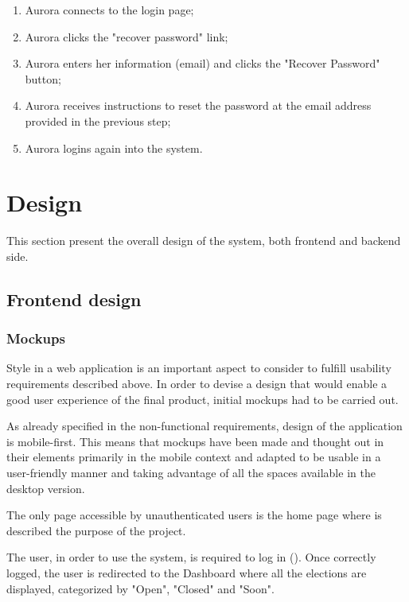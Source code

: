 \documentclass{scrartcl}
\begin{document}
\begin{enumerate}
    \item Aurora connects to the login page;
    \item Aurora clicks the "recover password" link;
    \item Aurora enters her information (email) and clicks the "Recover Password" button;
    \item Aurora receives instructions to reset the password at the email address provided in the previous step;
    \item Aurora logins again into the system.
\end{enumerate}

\section{Design}

This section present the overall design of the system, both frontend and backend side.

\subsection{Frontend design}

\subsubsection*{Mockups}

Style in a web application is an important aspect to consider to fulfill usability requirements described above.
%
In order to devise a design that would enable a good user experience of the final product, initial mockups had to be carried out. 

As already specified in the non-functional requirements, design of the application is mobile-first. 
%
This means that mockups have been made and thought out in their elements primarily in the mobile context and adapted to be usable in a user-friendly manner and taking advantage of all the spaces available in the desktop version.

The only page accessible by unauthenticated users is the home page where is described the purpose of the project.

The user, in order to use the system, is required to log in ().
%
Once correctly logged, the user is redirected to the Dashboard where all the elections are displayed, categorized by "Open", "Closed" and "Soon".
\end{document}
